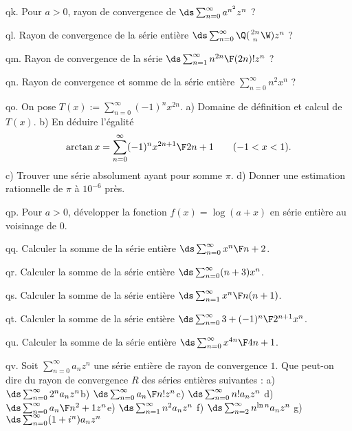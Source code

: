 \exo [Level=2,Fight=0,Learn=0,Type=\Exercices,Field=\SériesEntières,Origin=] qk. 
Pour $a>0$, rayon de convergence de $\ds\sum_{n=0}^\infty a^{n^2}z^n$ ?

\exo [Level=2,Fight=0,Learn=0,Type=\Exercices,Field=\SériesEntières,Origin=] ql. 
Rayon de convergence de la série entière $\ds\sum_{n=0}^\infty\Q({2n\atop n}\W)z^n$ ?

\exo [Level=2,Fight=0,Learn=0,Type=\Exercices,Field=\SériesEntières,Origin=] qm. 
Rayon de convergence de la série $\ds\sum_{n=1}^\infty {n^{2n}\F(2n)!}z^n$ ?

\exo [Level=2,Fight=0,Learn=0,Type=\Exercices,Field=\SériesEntières,Origin=] qn. 
Rayon de convergence et somme de la série entière $\sum_{n=0}^\infty n^2x^n$ ?

\exo [Level=2,Fight=0,Learn=0,Type=\Exercices,Field=\SériesEntières,Origin=] qo. 
On pose $T(x):=\sum_{n=0}^\infty(-1)^nx^{2n}$. \pn
a) Domaine de définition et calcul de $T(x)$. \pn
b) En déduire l'égalité 
$$
\arctan x=\sum_{n=0}^\infty(-1)^n{x^{2n+1}\F2n+1}\qquad(-1<x<1). 
$$
c) Trouver une série absolument ayant pour somme $\pi$. \pn
d) Donner une estimation rationnelle de $\pi$ à $10^{-6}$ près. 

\exo [Level=2,Fight=0,Learn=0,Type=\Exercices,Field=\SériesEntières,Origin=] qp. 
Pour $a>0$, développer la fonction $f(x)=\log(a+x)$ 
en série entière au voisinage de $0$.  

\exo [Level=2,Fight=0,Learn=0,Type=\Exercices,Field=\SériesEntières,Origin=] qq. 
Calculer la somme de la série entière $\ds\sum_{n=0}^\infty{x^n\F n+2}$. 

\exo [Level=2,Fight=0,Learn=0,Type=\Exercices,Field=\SériesEntières,Origin=] qr. 
Calculer la somme de la série entière $\ds\sum_{n=0}^\infty(n+3)x^n$. 

\exo [Level=2,Fight=0,Learn=0,Type=\Exercices,Field=\SériesEntières,Origin=] qs. 
Calculer la somme de la série entière $\ds\sum_{n=1}^\infty{x^n\F n(n+1)}$. 

\exo [Level=2,Fight=0,Learn=0,Type=\Exercices,Field=\SériesEntières,Origin=] qt. 
Calculer la somme de la série entière $\ds \sum_{n=0}^\infty{3+(-1)^n\F2^{n+1}}x^n$. 

\exo [Level=2,Fight=0,Learn=0,Type=\Exercices,Field=\SériesEntières,Origin=] qu. 
Calculer la somme de la série entière $\ds\sum_{n=0}^\infty{x^{4n}\F4n+1}$. 

\exo [Level=2,Fight=2,Learn=1,Type=\Exercices,Field=\SériesEntières,Origin=] qv. 
Soit $\sum_{n=0}^\infty a_nz^n$ une série entière de rayon de convergence $1$. 
Que peut-on dire du rayon de convergence $R$ des séries entières suivantes : \pn
a) $\ds\sum_{n=0}^\infty2^na_nz^n$\qquad\qquad b) $\ds\sum_{n=0}^\infty{a_n\F n!}z^n$\qquad\qquad c) $\ds\sum_{n=0}^\infty n!a_nz^n$\pn
d) $\ds\sum_{n=0}^\infty{a_n\F n^2+1}z^n$\qquad\qquad e) $\ds\sum_{n=1}^\infty n^2a_nz^n$\qquad\qquad 
f) $\ds\sum_{n=2}^\infty n^{\ln n}a_nz^n$\pn
g) $\ds\sum_{n=0}^\infty(1+i^n)a_nz^n$

